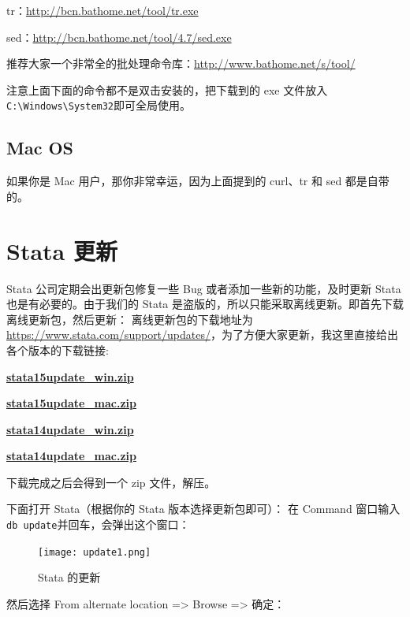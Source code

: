 \documentclass[cn,fancy,blue,11pt]{elegantbook}
\begin{document}
tr：\url{http://bcn.bathome.net/tool/tr.exe}

sed：\url{http://bcn.bathome.net/tool/4.7/sed.exe}

推荐大家一个非常全的批处理命令库：\url{http://www.bathome.net/s/tool/}

注意上面下面的命令都不是双击安装的，把下载到的 exe 文件放入\lstinline{C:\Windows\System32}即可全局使用。

\hypertarget{mac-os-3}{%
\subsection{Mac OS}\label{mac-os-3}}

如果你是 Mac 用户，那你非常幸运，因为上面提到的 curl、tr 和 sed 都是自带的。

\hypertarget{stata--2}{%
\section{Stata 更新}\label{stata--2}}

Stata 公司定期会出更新包修复一些 Bug 或者添加一些新的功能，及时更新 Stata 也是有必要的。由于我们的 Stata 是盗版的，所以只能采取离线更新。即首先下载离线更新包，然后更新：
离线更新包的下载地址为\url{https://www.stata.com/support/updates/}，为了方便大家更新，我这里直接给出各个版本的下载链接:

\textbf{\href{https://www.stata.com/support/updates/stata15/stata15update_win.zip}{stata15update\_win.zip}}

\textbf{\href{https://www.stata.com/support/updates/stata15/stata15update_mac.zip}{stata15update\_mac.zip}}

\textbf{\href{https://www.stata.com/support/updates/stata14/stata14update_win.zip}{stata14update\_win.zip}}

\textbf{\href{https://www.stata.com/support/updates/stata14/stata14update_mac.zip}{stata14update\_mac.zip}}

下载完成之后会得到一个 zip 文件，解压。

下面打开 Stata（根据你的 Stata 版本选择更新包即可）：
在 Command 窗口输入\lstinline{db update}并回车，会弹出这个窗口：

\begin{figure}[htbp]
  \centering
  \texttt{[image: update1.png]}
  \caption{Stata 的更新}
  \label{fig:update1}
\end{figure}

然后选择 From alternate location =\textgreater{} Browse =\textgreater{} 确定：
\end{document}
